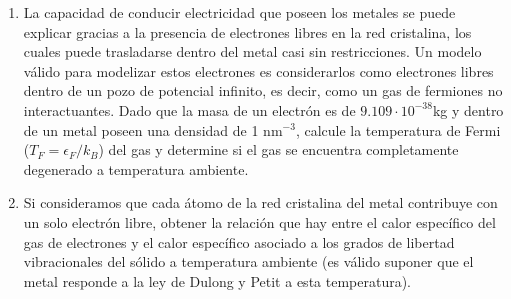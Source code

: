 \documentclass[a4paper,11pt]{article}
\begin{document}
\begin{enumerate}[label=(\alph*),
                  leftmargin=2\parindent,
                  rightmargin=2\parindent]
{          Si definimos $\Delta E = E(T) - E(T=0)$, el calor específico 
          puede calcularse como:
          $$
          C_V =
          \left( \frac{\partial \Delta E}{\partial T} \right)_{N, V},
          $$
          ya que restarle la energía del estado fundamental es 
          equivalente a un corrimiento rígido de la energía.
          
          Suponiendo que la cantidad de partículas en el gas no varía 
          significativamente para temperaturas cercanas al cero 
          absoluto, la diferencia entre $N(T)$ y $N(T=0)$ es 
          aproximadamente nula, y por ende puede ser introducida en la 
          expresión de $\Delta E$ (siendo previamente multiplicada por 
          $\epsilon_F$).
          Esta nueva expresión de $\Delta E$ es posible derivarla con 
          respecto a la temperatura para obtener una expresión del 
          calor específico.
          
          Demostrar entonces, que a través de este método obtenemos 
          el primer término del desarrollo de Sommerfeld:
          $$ C_V \simeq N k \frac{\pi^2}{2} \frac{kT}{\epsilon_F}. $$
         }
     
    \item{La capacidad de conducir electricidad que poseen los metales se 
          puede explicar gracias a la presencia de electrones libres en la 
          red cristalina, los cuales puede trasladarse dentro del metal casi 
          sin restricciones.
          Un modelo válido para modelizar estos electrones es 
          considerarlos como electrones libres dentro de un pozo de 
          potencial infinito, es decir, como un gas de fermiones no 
          interactuantes.
          Dado que la masa de un electrón es de $9.109 \cdot 
          10^{-38}$kg y dentro de un metal poseen una densidad de 1 
          nm$^{-3}$, calcule la temperatura de Fermi
          ($T_F = \epsilon_F/k_B$) del gas y determine si el gas se 
          encuentra completamente degenerado a temperatura ambiente.
          }
    
    \item{Si consideramos que cada átomo de la red cristalina del 
          metal contribuye con un solo electrón libre, obtener la relación 
          que hay entre el calor específico del gas de electrones y el calor 
          específico asociado a los grados de libertad vibracionales del 
          sólido a temperatura ambiente (es válido suponer que el metal 
          responde a la ley de Dulong y Petit a esta temperatura).
          }

\end{enumerate}
\end{document}

